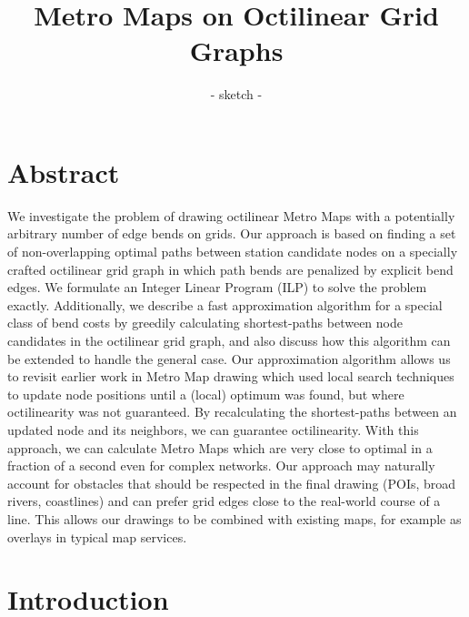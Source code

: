 \documentclass[sigconf]{acmart}
\begin{document}
\title{Metro Maps on Octilinear Grid Graphs}
\subtitle{- sketch -}


\maketitle

\section{Abstract}

We investigate the problem of drawing octilinear Metro Maps with a potentially arbitrary number of edge bends on grids.
Our approach is based on finding a set of non-overlapping optimal paths between station candidate nodes on a specially crafted octilinear grid graph in which path bends are penalized by explicit bend edges.
We formulate an Integer Linear Program (ILP) to solve the problem exactly.
Additionally, we describe a fast approximation algorithm for a special class of bend costs by greedily calculating shortest-paths between node candidates in the octilinear grid graph, and also discuss how this algorithm can be extended to handle the general case.
Our approximation algorithm allows us to revisit earlier work in Metro Map drawing which used local search techniques to update node positions until a (local) optimum was found, but where octilinearity was not guaranteed.
By recalculating the shortest-paths between an updated node and its neighbors, we can guarantee octilinearity.
With this approach, we can calculate Metro Maps which are very close to optimal in a fraction of a second even for complex networks.
Our approach may naturally account for obstacles that should be respected in the final drawing (POIs, broad rivers, coastlines) and can prefer grid edges  close to the real-world course of a line.
This allows our drawings to be combined with existing maps, for example as overlays in typical map services.

\section{Introduction}
\end{document}

